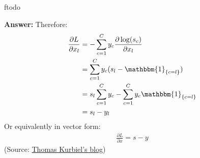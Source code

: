 ƒtodo\documentclass{article}
\newenvironment{QandA}{\begin{enumerate}[label=\arabic*.]}{\end{enumerate}}
\newenvironment{answer}{\par\normalfont \textbf{Answer:}}{}
\newcommand{\Indicator}[1]{\mathbbm{1}_{\left\{ #1 \right\}}}
\begin{document}
\begin{QandA}
\begin{answer}
        Therefore:
        \begin{align*}
            \frac{\partial L}{\partial x_l} &= - \sum_{c=1}^C y_c  \frac{\partial \log (s_c)}{\partial x_l}  \\
            &= \sum_{c=1}^C y_c (s_l - \Indicator{c = l}) \\
            &= s_l \sum_{c=1}^C y_c - \sum_{c=1}^C y_c \Indicator{c = l} \\
            &= s_l - y_l
        \end{align*}
        Or equivalently in vector form:
        \begin{align*}
            \frac{\partial L}{\partial x} = s - y 
        \end{align*}
    (Source:  \href{https://towardsdatascience.com/derivative-of-the-softmax-function-and-the-categorical-cross-entropy-loss-ffceefc081d1}{Thomas Kurbiel's blog})  \end{answer}


\end{QandA}
\end{document}
